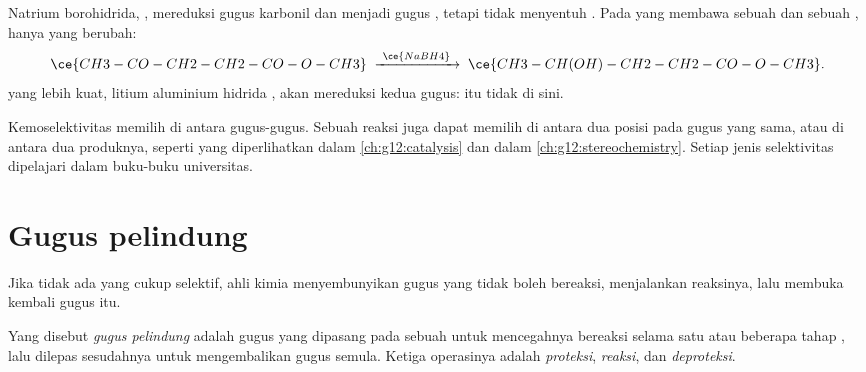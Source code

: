 \begin{example}\label{ex:g12:synthesis-strategy:nabh4}
Natrium borohidrida, , mereduksi gugus karbonil  dan
 menjadi gugus , tetapi tidak menyentuh . Pada 
yang membawa sebuah  dan sebuah , hanya  yang
berubah:
\[
  \ce{CH3-CO-CH2-CH2-CO-O-CH3}
  \;\xrightarrow{\ \ce{NaBH4}\ }\;
  \ce{CH3-CH(OH)-CH2-CH2-CO-O-CH3} .
\]
 yang lebih kuat, litium aluminium hidrida , akan
mereduksi kedua gugus:  itu tidak  di sini.
\end{example}

\begin{remark}\label{rem:g12:synthesis-strategy:kinds}
Kemoselektivitas memilih di antara gugus-gugus. Sebuah reaksi juga dapat
memilih di antara dua posisi pada gugus yang sama, atau di antara dua
 produknya, seperti yang diperlihatkan  dalam
\cref{ch:g12:catalysis} dan   dalam
\cref{ch:g12:stereochemistry}. Setiap jenis selektivitas dipelajari
dalam buku-buku universitas.
\end{remark}

\section{Gugus pelindung}

Jika tidak ada  yang cukup selektif, ahli kimia menyembunyikan
gugus yang tidak boleh bereaksi, menjalankan reaksinya, lalu membuka
kembali gugus itu.

\begin{definition}\label{def:g12:synthesis-strategy:protecting-group}
Yang disebut \emph{gugus pelindung} adalah gugus
yang dipasang pada sebuah  untuk mencegahnya bereaksi
selama satu atau beberapa tahap , lalu dilepas sesudahnya untuk
mengembalikan gugus semula. Ketiga operasinya adalah
\emph{proteksi}, \emph{reaksi}, dan \emph{deproteksi}.
\end{definition}

